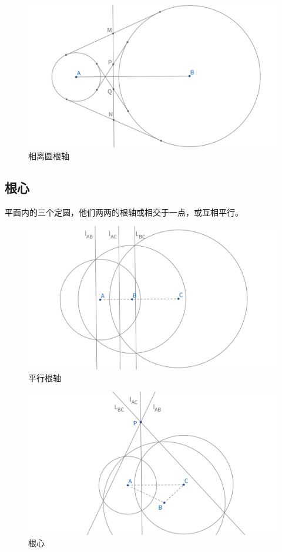 \begin{figure}[H]
\begin{minipage}[t]{0.3\textwidth}
    \centering
    \includegraphics[width=\linewidth]{figures/相离圆根轴.png}
    \caption{相离圆根轴}
    \end{minipage}
\end{figure}


\newpage 
\subsection{根心}
\begin{theorem}[根心定理]
    平面内的三个定圆，他们两两的根轴或相交于一点，或互相平行。
\end{theorem}
\begin{figure}[H]
    \centering
    \includegraphics[width=0.8\linewidth]{figures/平行根轴.png}
    \caption{平行根轴}
\end{figure}
\begin{figure}[H]
    \centering
    \includegraphics[width=0.8\linewidth]{figures/根心.png}
    \caption{根心}
\end{figure}